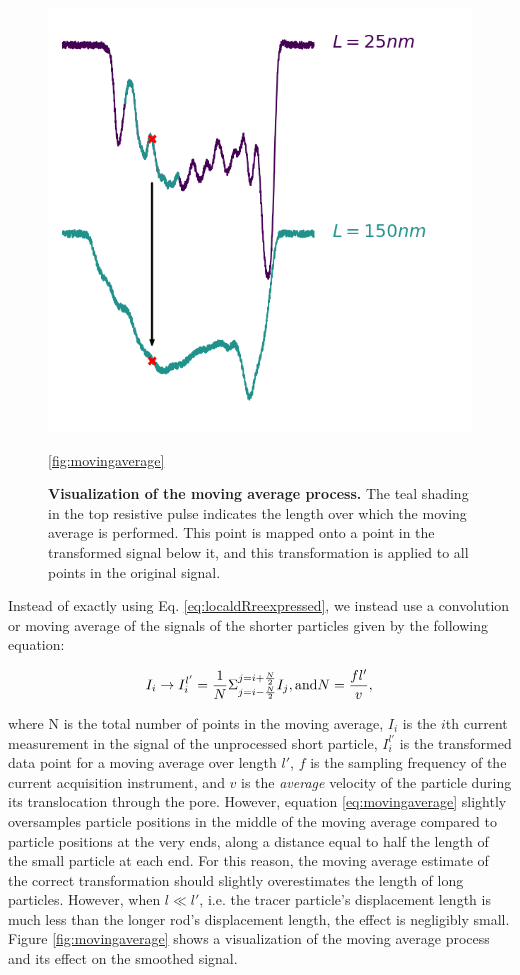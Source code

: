 			\begin{figure}
				\includegraphics[width=.5\textwidth]{moving_average_process.png}
				\caption{\textbf{Visualization of the moving average process.} The teal shading in the top resistive pulse indicates the length over which the moving average is performed. This point is mapped onto a point in the transformed signal below it, and this transformation is applied to all points in the original signal.}
				\ref{fig:movingaverage}
			\end{figure}

			
			Instead of exactly using Eq. \ref{eq:localdRreexpressed}, we instead use a convolution or moving average of the signals of the shorter particles given by the following equation:
			
			\begin{equation}\label{eq:movingaverage}
				I_{i}\rightarrow I_{i}^{l'}=\frac{1}{N}\Sigma_{j=i-\frac{N}{2}}^{j=i+\frac{N}{2}}I_{j}, \mathrm{and} \\
				N=\frac{fl'}{v},
			\end{equation}
			
			where N is the total number of points in the moving average, $I_{i}$ is the $i$th current measurement in the signal of the unprocessed short particle, $I_{i}^{l'}$ is the transformed data point for a moving average over length $l'$, $f$ is the sampling frequency of the current acquisition instrument, and $v$ is the \textit{average} velocity of the particle during its translocation through the pore. However, equation \ref{eq:movingaverage} slightly oversamples particle positions in the middle of the moving average compared to particle positions at the very ends, along a distance equal to half the length of the small particle at each end. For this reason, the moving average estimate of the correct transformation should slightly overestimates the length of long particles. However, when $l\ll l'$, i.e. the tracer particle's displacement length is much less than the longer rod's displacement length, the effect is negligibly small. Figure \ref{fig:movingaverage} shows a visualization of the moving average process and its effect on the smoothed signal.

